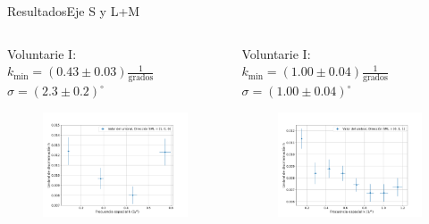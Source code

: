 \documentclass[
    11pt, %
    aspectratio=169, %
]{beamer}
\begin{document}
\begin{frame}{Resultados}{Eje S y L+M}
    \begin{columns}[c] %

    
		\begin{column}{0.50\textwidth} %
            \begin{center}
                Voluntarie I: \\ $k_{\text{min}} = (0.43 \pm 0.03)\frac{1}{\text{grados}}$ \\ $\sigma = (2.3 \pm 0.2)^\circ$
            \end{center}  
                     \begin{figure}[h!]
                    \centering
                    \includegraphics[angle=0, width=5cm]{Images/resultados/ines_s.png}
                \end{figure}
               
        
               
		\end{column}

    
  		\begin{column}{0.50\textwidth} %
            \begin{center}
                Voluntarie I: \\ $k_{\text{min}} = (1.00 \pm 0.04)\frac{1}{\text{grados}}$ \\ $\sigma = (1.00 \pm 0.04)^\circ$
            \end{center}
                 \begin{figure}[h!]
                    \centering
                    \includegraphics[angle=0, width=5cm]{Images/resultados/ines_l_mas_m.png}
                \end{figure}
		\end{column}		
	\end{columns}

\end{frame}
\end{document}
